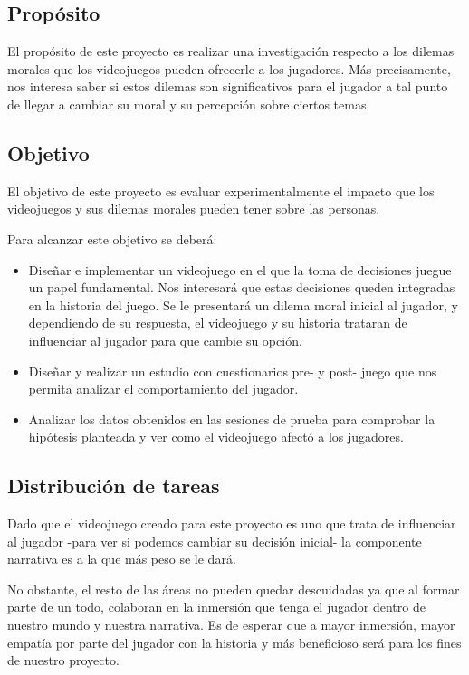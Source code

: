 \subsection{Propósito}

El propósito de este proyecto es realizar una investigación respecto a los dilemas morales que los videojuegos pueden ofrecerle a los jugadores. Más precisamente, nos interesa saber si estos dilemas son significativos para el jugador a tal punto de llegar a cambiar su moral y su percepción sobre ciertos temas.


\subsection{Objetivo}

El objetivo de este proyecto es evaluar experimentalmente el impacto que los videojuegos y sus dilemas morales pueden tener sobre las personas.

Para alcanzar este objetivo se deberá:
\begin{itemize}
    \item Diseñar e implementar un videojuego en el que la toma de decisiones juegue un papel fundamental. Nos interesará que estas decisiones queden integradas en la historia del juego. Se le presentará un dilema moral inicial al jugador, y dependiendo de su respuesta, el videojuego y su historia trataran de influenciar al jugador para que cambie su opción.
    \item Diseñar y realizar un estudio con cuestionarios pre- y post- juego que nos permita analizar el comportamiento del jugador.
    \item Analizar los datos obtenidos en las sesiones de prueba para comprobar la hipótesis planteada y ver como el videojuego afectó a los jugadores.
\end{itemize}

\subsection{Distribución de tareas}

Dado que el videojuego creado para este proyecto es uno que trata de influenciar al jugador -para ver si podemos cambiar su decisión inicial- la componente narrativa es a la que más peso se le dará.

No obstante, el resto de las áreas no pueden quedar descuidadas ya que al formar parte de un todo, colaboran en la inmersión que tenga el jugador dentro de nuestro mundo y nuestra narrativa. Es de esperar que a mayor inmersión, mayor empatía por parte del jugador con la historia y más beneficioso será para los fines de nuestro proyecto.

